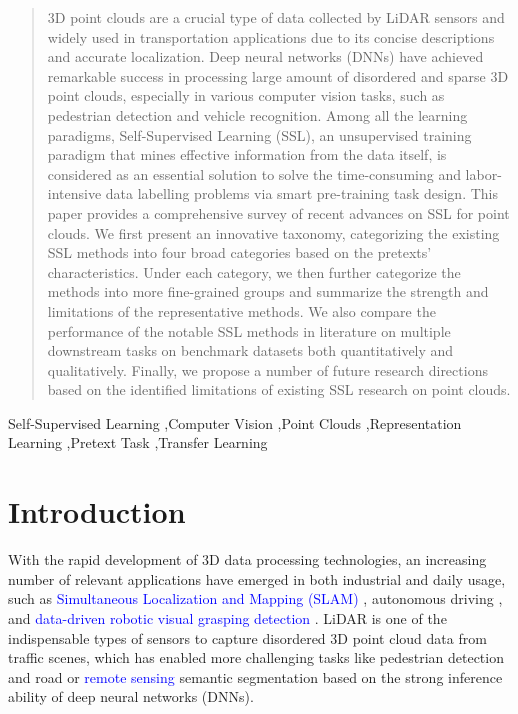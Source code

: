 \documentclass[a4paper,fleqn]{cas-dc}
\begin{document}
\begin{abstract}
    3D point clouds are a crucial type of data collected by LiDAR sensors and widely used in transportation applications due to its concise descriptions and accurate localization. Deep neural networks (DNNs) have achieved remarkable success in processing large amount of disordered and sparse 3D point clouds, especially in various computer vision tasks, such as pedestrian detection and vehicle recognition. Among all the learning paradigms, Self-Supervised Learning (SSL), an unsupervised training paradigm that mines effective information from the data itself, is considered as an essential solution to solve the time-consuming and labor-intensive data labelling problems via smart pre-training task design. This paper provides a comprehensive survey of recent advances on SSL for point clouds. We first present an innovative taxonomy, categorizing the existing SSL methods into four broad categories based on the pretexts' characteristics. Under each category, we then further categorize the methods into more fine-grained groups and summarize the strength and limitations of the representative methods. We also compare the performance of the notable SSL methods in literature on multiple downstream tasks on benchmark datasets both quantitatively and qualitatively. Finally, we propose a number of future research directions based on the identified limitations of existing SSL research on point clouds.
\end{abstract}

\begin{keywords}
    Self-Supervised Learning \sep Computer Vision \sep Point Clouds \sep Representation Learning \sep Pretext Task \sep Transfer Learning
\end{keywords}

\maketitle

\section{Introduction}
With the rapid development of 3D data processing technologies, an increasing number of relevant applications have emerged in both industrial and daily usage, such as \textcolor{blue}{Simultaneous Localization and Mapping (SLAM) \citep{kazerouni2022survey}}, autonomous driving \citep{YingLi2020DeepLF}, and \textcolor{blue}{data-driven robotic visual grasping detection \citep{tian2022data}}. LiDAR is one of the indispensable types of sensors to capture disordered 3D point cloud data from traffic scenes, which has enabled more challenging tasks like pedestrian detection \citep{8078512} and road \citep{wu2019squeezesegv2} or \textcolor{blue}{remote sensing} \citep{yuan2021review} semantic segmentation based on the strong inference ability of deep neural networks (DNNs).
\end{document}
